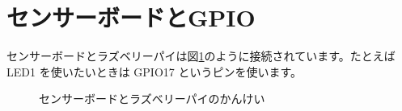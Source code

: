\section{センサーボードとGPIO}
センサーボードとラズベリーパイは図\ref{sensors}のように接続されています。たとえば LED1 を使いたいときは GPIO17 というピンを使います。

\begin{figure}[H]
    \centering
    
    \caption{センサーボードとラズベリーパイのかんけい}
    \label{sensors}
\end{figure}









